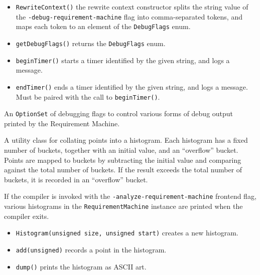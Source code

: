 \documentclass[../generics]{subfiles}
\begin{document}
\begin{itemize}
\item \texttt{RewriteContext()} the rewrite context constructor splits the string value of the \texttt{-debug-requirement-machine} flag into comma-separated tokens, and maps each token to an element of the \texttt{DebugFlags} enum.
\item \texttt{getDebugFlags()} returns the \texttt{DebugFlags} enum.
\item \texttt{beginTimer()} starts a timer identified by the given string, and logs a message.
\item \texttt{endTimer()} ends a timer identified by the given string, and logs a message. Must be paired with the call to \texttt{beginTimer()}.
\end{itemize}

An \texttt{OptionSet} of debugging flags to control various forms of debug output printed by the Requirement Machine.

%
A utility class for collating points into a histogram. Each histogram has a fixed number of buckets, together with an initial value, and an ``overflow'' bucket. Points are mapped to buckets by subtracting the initial value and comparing against the total number of buckets. If the result exceeds the total number of buckets, it is recorded in an ``overflow'' bucket.

If the compiler is invoked with the \texttt{-analyze-requirement-machine} frontend flag, various histograms in the \texttt{RequirementMachine} instance are printed when the compiler exits.
\begin{itemize}
\item \texttt{Histogram(unsigned size, unsigned start)} creates a new histogram.
\item \texttt{add(unsigned)} records a point in the histogram.
\item \texttt{dump()} prints the histogram as ASCII art.
\end{itemize}
\end{document}
